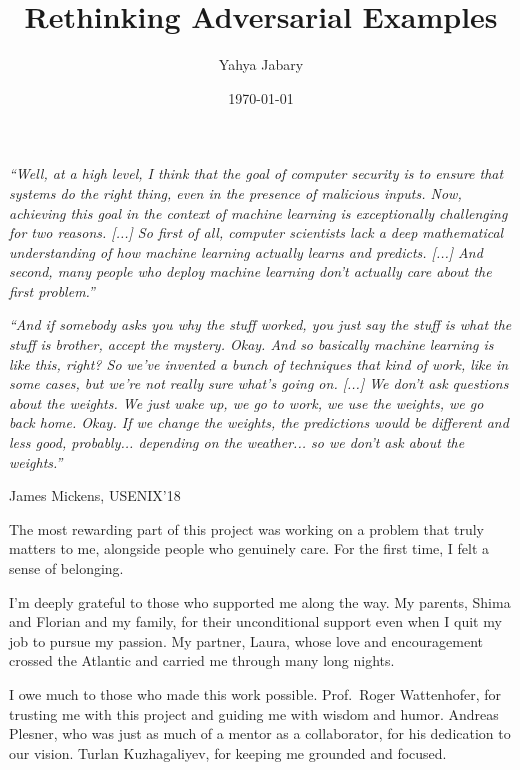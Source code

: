 \documentclass[a4paper, oneside]{discothesis}
\title{Rethinking Adversarial Examples}
\author{Yahya Jabary}
\institute{Computer Engineering and Networks Laboratory \\[2pt] ETH Zürich}
\date{\today}
\newcommand{\linebreaks}{\vspace*{0.5em}}
\begin{document}
\frontmatter
\maketitle

\cleardoublepage

\begin{acknowledgements}
	\begin{quotebox}
		\begin{flushright}
			\textit{``Well, at a high level, I think that the goal of computer security is to ensure that systems do the right thing, even in the presence of malicious inputs. Now, achieving this goal in the context of machine learning is exceptionally challenging for two reasons. [...] So first of all, computer scientists lack a deep mathematical understanding of how machine learning actually learns and predicts. [...] And second, many people who deploy machine learning don't actually care about the first problem.''}
			\vspace{1em}
	
			\textit{``And if somebody asks you why the stuff worked, you just say the stuff is what the stuff is brother, accept the mystery. Okay. And so basically machine learning is like this, right? So we've invented a bunch of techniques that kind of work, like in some cases, but we're not really sure what's going on. [...] We don't ask questions about the weights. We just wake up, we go to work, we use the weights, we go back home. Okay. If we change the weights, the predictions would be different and less good, probably... depending on the weather... so we don't ask about the weights.''}
			\vspace{1em}
	
			James Mickens, USENIX'18~\cite{218395}
		\end{flushright}
	\end{quotebox}

	\linebreaks

	The most rewarding part of this project was working on a problem that truly matters to me, alongside people who genuinely care. For the first time, I felt a sense of belonging.

	I'm deeply grateful to those who supported me along the way. My parents, Shima and Florian and my family, for their unconditional support \textendash{} even when I quit my job to pursue my passion. My partner, Laura, whose love and encouragement crossed the Atlantic and carried me through many long nights.

	I owe much to those who made this work possible. Prof.\ Roger Wattenhofer, for trusting me with this project and guiding me with wisdom and humor. Andreas Plesner, who was just as much of a mentor as a collaborator, for his dedication to our vision. Turlan Kuzhagaliyev, for keeping me grounded and focused.


\end{acknowledgements}
\end{document}
